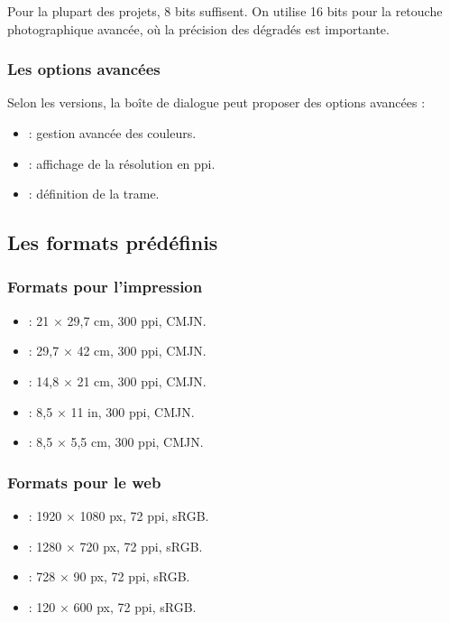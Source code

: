 Pour la plupart des projets, 8 bits suffisent. On utilise 16 bits pour la retouche photographique avancée, où la précision des dégradés est importante.

\subsubsection{Les options avancées}

Selon les versions, la boîte de dialogue peut proposer des options avancées :

\begin{itemize}
    \item {} : gestion avancée des couleurs.
    \item {} : affichage de la résolution en ppi.
    \item {} : définition de la trame.
\end{itemize}

\subsection{Les formats prédéfinis}

\subsubsection{Formats pour l'impression}

\begin{itemize}
    \item {} : 21 × 29,7 cm, 300 ppi, CMJN.
    \item {} : 29,7 × 42 cm, 300 ppi, CMJN.
    \item {} : 14,8 × 21 cm, 300 ppi, CMJN.
    \item {} : 8,5 × 11 in, 300 ppi, CMJN.
    \item {} : 8,5 × 5,5 cm, 300 ppi, CMJN.
\end{itemize}

\subsubsection{Formats pour le web}

\begin{itemize}
    \item {} : 1920 × 1080 px, 72 ppi, sRGB.
    \item {} : 1280 × 720 px, 72 ppi, sRGB.
    \item {} : 728 × 90 px, 72 ppi, sRGB.
    \item {} : 120 × 600 px, 72 ppi, sRGB.
\end{itemize}

